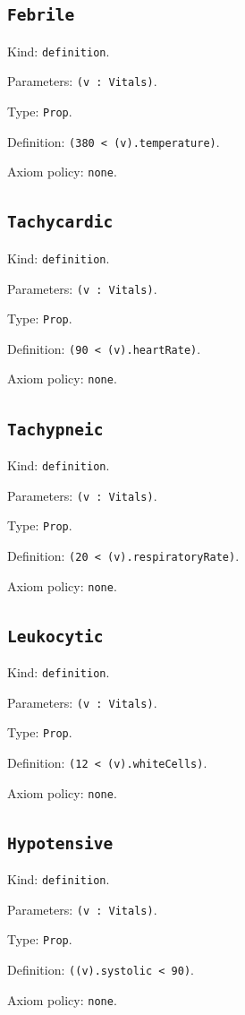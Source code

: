\documentclass[11pt]{article}
\begin{document}
\subsection*{\texttt{Febrile}}
\noindent Kind: \texttt{definition}.\par
\noindent Parameters: \texttt{(v : Vitals)}.\par
\noindent Type: \texttt{Prop}.\par
\noindent Definition: \texttt{(380 < (v).temperature)}.\par
\noindent Axiom policy: \texttt{none}.\par
\subsection*{\texttt{Tachycardic}}
\noindent Kind: \texttt{definition}.\par
\noindent Parameters: \texttt{(v : Vitals)}.\par
\noindent Type: \texttt{Prop}.\par
\noindent Definition: \texttt{(90 < (v).heartRate)}.\par
\noindent Axiom policy: \texttt{none}.\par
\subsection*{\texttt{Tachypneic}}
\noindent Kind: \texttt{definition}.\par
\noindent Parameters: \texttt{(v : Vitals)}.\par
\noindent Type: \texttt{Prop}.\par
\noindent Definition: \texttt{(20 < (v).respiratoryRate)}.\par
\noindent Axiom policy: \texttt{none}.\par
\subsection*{\texttt{Leukocytic}}
\noindent Kind: \texttt{definition}.\par
\noindent Parameters: \texttt{(v : Vitals)}.\par
\noindent Type: \texttt{Prop}.\par
\noindent Definition: \texttt{(12 < (v).whiteCells)}.\par
\noindent Axiom policy: \texttt{none}.\par
\subsection*{\texttt{Hypotensive}}
\noindent Kind: \texttt{definition}.\par
\noindent Parameters: \texttt{(v : Vitals)}.\par
\noindent Type: \texttt{Prop}.\par
\noindent Definition: \texttt{((v).systolic < 90)}.\par
\noindent Axiom policy: \texttt{none}.\par
\end{document}
